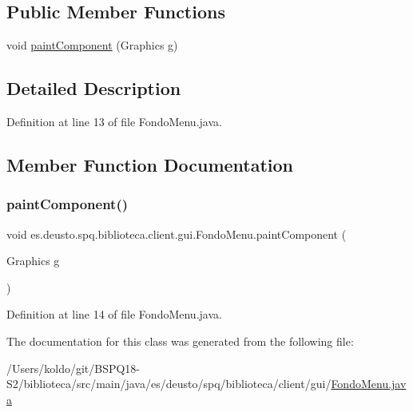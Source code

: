 \subsection*{Public Member Functions}
\begin{DoxyCompactItemize}
\item 
void \mbox{\hyperlink{classes_1_1deusto_1_1spq_1_1biblioteca_1_1client_1_1gui_1_1_fondo_menu_a98c9daab8e59effac9ced7819137cf9a}{paint\+Component}} (Graphics g)
\end{DoxyCompactItemize}


\subsection{Detailed Description}


Definition at line 13 of file Fondo\+Menu.\+java.



\subsection{Member Function Documentation}
\mbox{\label{classes_1_1deusto_1_1spq_1_1biblioteca_1_1client_1_1gui_1_1_fondo_menu_a98c9daab8e59effac9ced7819137cf9a}} 
\subsubsection{\texorpdfstring{paint\+Component()}{paintComponent()}}
{\footnotesize\ttfamily void es.\+deusto.\+spq.\+biblioteca.\+client.\+gui.\+Fondo\+Menu.\+paint\+Component (\begin{DoxyParamCaption}\item[{Graphics}]{g }\end{DoxyParamCaption})}



Definition at line 14 of file Fondo\+Menu.\+java.



The documentation for this class was generated from the following file\+:\begin{DoxyCompactItemize}
\item 
/\+Users/koldo/git/\+B\+S\+P\+Q18-\/\+S2/biblioteca/src/main/java/es/deusto/spq/biblioteca/client/gui/\mbox{\hyperlink{_fondo_menu_8java}{Fondo\+Menu.\+java}}\end{DoxyCompactItemize}
